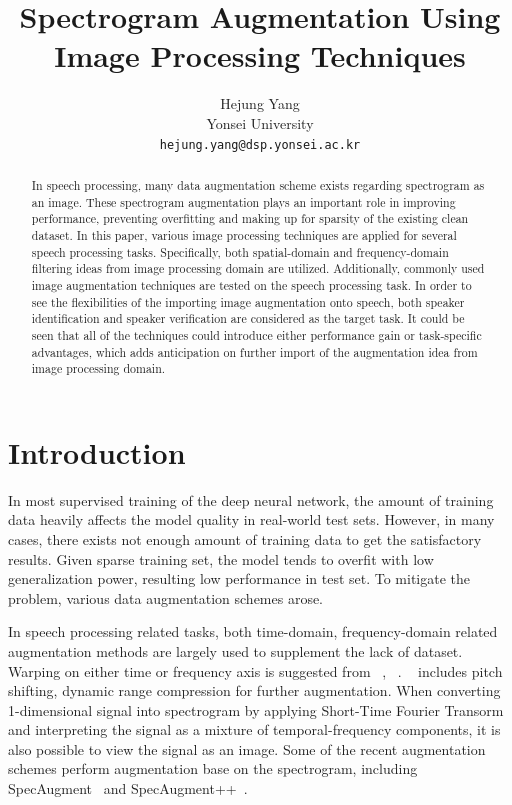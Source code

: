 \documentclass[10pt,twocolumn,letterpaper]{article}
\begin{document}
\title{Spectrogram Augmentation Using Image Processing Techniques}

\author{Hejung Yang\\
Yonsei University\\
{\tt\small hejung.yang@dsp.yonsei.ac.kr}
}
\maketitle

\begin{abstract}
   In speech processing, many data augmentation scheme exists regarding spectrogram as an image.
   These spectrogram augmentation plays an important role in improving performance, preventing 
   overfitting and making up for sparsity of the existing clean dataset.
   In this paper, various image processing techniques are applied for several speech processing tasks.
   Specifically, both spatial-domain and frequency-domain filtering ideas from image processing domain 
   are utilized. Additionally, commonly used image augmentation techniques are tested on the speech 
   processing task. In order to see the flexibilities of the importing image augmentation onto speech,
   both speaker identification and speaker verification are considered as the target task.
   It could be seen that all of the techniques could introduce either performance gain or task-specific 
   advantages, which adds anticipation on further import of the augmentation idea from image processing domain.
\end{abstract}

\section{Introduction}
\label{sec:intro}

In most supervised training of the deep neural network, the amount of training data heavily affects
the model quality in real-world test sets. However, in many cases, there exists not enough amount of 
training data to get the satisfactory results. Given sparse training set, the model tends to overfit with low 
generalization power, resulting low performance in test set. 
To mitigate the problem, various data augmentation schemes arose. 

In speech processing related tasks, both time-domain, frequency-domain related augmentation methods
are largely used to supplement the lack of dataset. Warping on either time or frequency axis is suggested 
from ~\cite{jaitly2013vocal}, ~\cite{ko2015audio}. ~\cite{salamon2017deep} includes pitch shifting, 
dynamic range compression for further augmentation. 
When converting 1-dimensional signal into spectrogram by applying Short-Time Fourier Transorm and 
interpreting the signal as a mixture of temporal-frequency
components, it is also possible to view the signal as an image. 
Some of the recent augmentation schemes perform augmentation base on the spectrogram, including 
SpecAugment~\cite{park2019specaugment} and SpecAugment++~\cite{wang2021specaugment++}.
\end{document}
